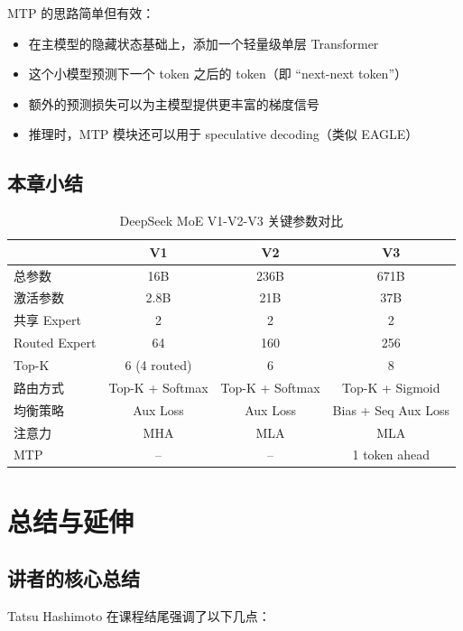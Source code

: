 \documentclass[a4paper]{article}
\begin{document}
MTP 的思路简单但有效：
\begin{itemize}
    \item 在主模型的隐藏状态基础上，添加一个轻量级单层 Transformer
    \item 这个小模型预测下一个 token 之后的 token（即 ``next-next token''）
    \item 额外的预测损失可以为主模型提供更丰富的梯度信号
    \item 推理时，MTP 模块还可以用于 speculative decoding（类似 EAGLE）
\end{itemize}

\subsection{本章小结}

\begin{table}[H]
\centering
\begin{tabular}{lccc}
\toprule
& \textbf{V1} & \textbf{V2} & \textbf{V3} \\
\midrule
总参数 & 16B & 236B & 671B \\
激活参数 & 2.8B & 21B & 37B \\
共享 Expert & 2 & 2 & 2 \\
Routed Expert & 64 & 160 & 256 \\
Top-K & 6 (4 routed) & 6 & 8 \\
路由方式 & Top-K + Softmax & Top-K + Softmax & Top-K + Sigmoid \\
均衡策略 & Aux Loss & Aux Loss & Bias + Seq Aux Loss \\
注意力 & MHA & MLA & MLA \\
MTP & -- & -- & 1 token ahead \\
\bottomrule
\end{tabular}
\caption{DeepSeek MoE V1-V2-V3 关键参数对比}
\end{table}


\section{总结与延伸}

\subsection{讲者的核心总结}

Tatsu Hashimoto 在课程结尾强调了以下几点：
\end{document}
